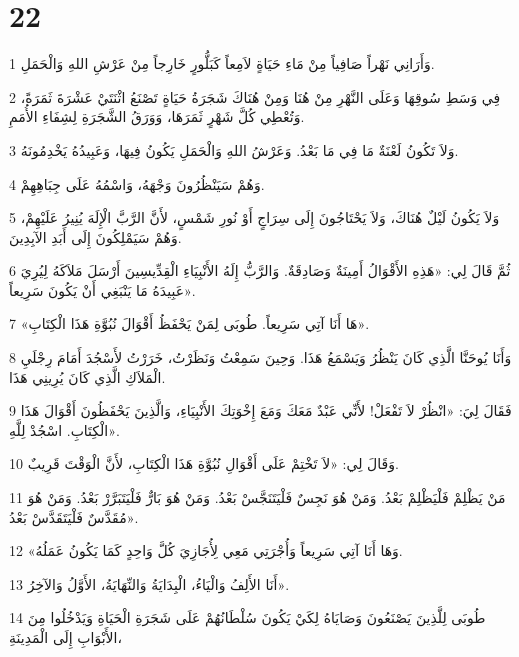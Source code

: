 \chapter{22}

\par 1 وَأَرَانِي نَهْراً صَافِياً مِنْ مَاءِ حَيَاةٍ لاَمِعاً كَبَلُّورٍ خَارِجاً مِنْ عَرْشِ اللهِ وَالْحَمَلِ.
\par 2 فِي وَسَطِ سُوقِهَا وَعَلَى النَّهْرِ مِنْ هُنَا وَمِنْ هُنَاكَ شَجَرَةُ حَيَاةٍ تَصْنَعُ اثْنَتَيْ عَشْرَةَ ثَمَرَةً، وَتُعْطِي كُلَّ شَهْرٍ ثَمَرَهَا، وَوَرَقُ الشَّجَرَةِ لِشِفَاءِ الأُمَمِ.
\par 3 وَلاَ تَكُونُ لَعْنَةٌ مَا فِي مَا بَعْدُ. وَعَرْشُ اللهِ وَالْحَمَلِ يَكُونُ فِيهَا، وَعَبِيدُهُ يَخْدِمُونَهُ.
\par 4 وَهُمْ سَيَنْظُرُونَ وَجْهَهُ، وَاسْمُهُ عَلَى جِبَاهِهِمْ.
\par 5 وَلاَ يَكُونُ لَيْلٌ هُنَاكَ، وَلاَ يَحْتَاجُونَ إِلَى سِرَاجٍ أَوْ نُورِ شَمْسٍ، لأَنَّ الرَّبَّ الْإِلَهَ يُنِيرُ عَلَيْهِمْ، وَهُمْ سَيَمْلِكُونَ إِلَى أَبَدِ الآبِدِينَ.
\par 6 ثُمَّ قَالَ لِي: «هَذِهِ الأَقْوَالُ أَمِينَةٌ وَصَادِقَةٌ. وَالرَّبُّ إِلَهُ الأَنْبِيَاءِ الْقِدِّيسِينَ أَرْسَلَ مَلاَكَهُ لِيُرِيَ عَبِيدَهُ مَا يَنْبَغِي أَنْ يَكُونَ سَرِيعاً».
\par 7 «هَا أَنَا آتِي سَرِيعاً. طُوبَى لِمَنْ يَحْفَظُ أَقْوَالَ نُبُوَّةِ هَذَا الْكِتَابِ».
\par 8 وَأَنَا يُوحَنَّا الَّذِي كَانَ يَنْظُرُ وَيَسْمَعُ هَذَا. وَحِينَ سَمِعْتُ وَنَظَرْتُ، خَرَرْتُ لأَسْجُدَ أَمَامَ رِجْلَيِ الْمَلاَكِ الَّذِي كَانَ يُرِينِي هَذَا.
\par 9 فَقَالَ لِيَ: «انْظُرْ لاَ تَفْعَلْ! لأَنِّي عَبْدٌ مَعَكَ وَمَعَ إِخْوَتِكَ الأَنْبِيَاءِ، وَالَّذِينَ يَحْفَظُونَ أَقْوَالَ هَذَا الْكِتَابِ. اسْجُدْ لِلَّهِ».
\par 10 وَقَالَ لِي: «لاَ تَخْتِمْ عَلَى أَقْوَالِ نُبُوَّةِ هَذَا الْكِتَابِ، لأَنَّ الْوَقْتَ قَرِيبٌ.
\par 11 مَنْ يَظْلِمْ فَلْيَظْلِمْ بَعْدُ. وَمَنْ هُوَ نَجِسٌ فَلْيَتَنَجَّسْ بَعْدُ. وَمَنْ هُوَ بَارٌّ فَلْيَتَبَرَّرْ بَعْدُ. وَمَنْ هُوَ مُقَدَّسٌ فَلْيَتَقَدَّسْ بَعْدُ».
\par 12 «وَهَا أَنَا آتِي سَرِيعاً وَأُجْرَتِي مَعِي لِأُجَازِيَ كُلَّ وَاحِدٍ كَمَا يَكُونُ عَمَلُهُ.
\par 13 أَنَا الأَلِفُ وَالْيَاءُ، الْبِدَايَةُ وَالنِّهَايَةُ، الأَوَّلُ وَالآخِرُ».
\par 14 طُوبَى لِلَّذِينَ يَصْنَعُونَ وَصَايَاهُ لِكَيْ يَكُونَ سُلْطَانُهُمْ عَلَى شَجَرَةِ الْحَيَاةِ وَيَدْخُلُوا مِنَ الأَبْوَابِ إِلَى الْمَدِينَةِ،
